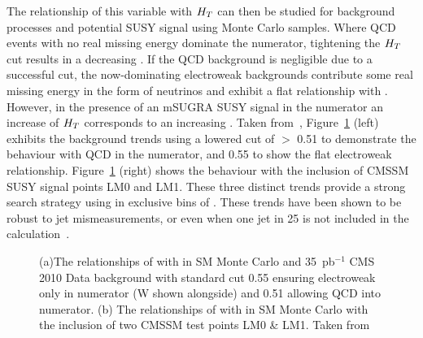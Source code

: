 The relationship of this variable with $H_{T}$ can then be studied for background processes and potential SUSY signal using Monte Carlo samples. Where QCD events with no real missing energy dominate the numerator, tightening the $H_{T}$ cut results in a decreasing \RaT. If the QCD background is negligible due to a successful \alt cut, the now-dominating  electroweak backgrounds contribute some real missing energy in the form of neutrinos and exhibit a flat relationship with \HT. However, in the presence of an mSUGRA SUSY signal in the numerator an increase of $H_{T}$ corresponds to an increasing \RaT. Taken from~\cite{35paper}, Figure~\ref{fig:ratfigs} (left) exhibits the background trends using a lowered cut of \alt $>$ 0.51 to demonstrate the behaviour with QCD in the numerator, and 0.55 to show the flat electroweak relationship. Figure~\ref{fig:ratfigs} (right) shows the behaviour with the inclusion of CMSSM SUSY signal points LM0 and LM1. These three distinct trends provide a strong search strategy using \RaT in exclusive bins of \HT. These trends have been shown to be robust to jet mismeasurements, or even when one jet in 25 is not included in the calculation~\cite{an2010_119}.


\begin{figure}[htbp]
\begin{center}

\caption[(a)The relationships of \RaT with \HT in SM Monte Carlo and 35~pb$^{-1}$ CMS 2010 Data  background with standard \alt cut 0.55 ensuring electroweak only in numerator (W shown alongside) and 0.51 allowing QCD into numerator. (b) The relationships of \RaT with \HT in SM Monte Carlo with the inclusion of two CMSSM test points LM0 \& LM1.]{\label{fig:ratfigs}(a)The relationships of \RaT with \HT in SM Monte Carlo and 35~pb$^{-1}$ CMS 2010 Data  background with standard \alt cut 0.55 ensuring electroweak only in numerator (W shown alongside) and 0.51 allowing QCD into numerator. (b) The relationships of \RaT with \HT in SM Monte Carlo with the inclusion of two CMSSM test points LM0 \& LM1. Taken from~\cite{35paper}}
\end{center}
\end{figure}



